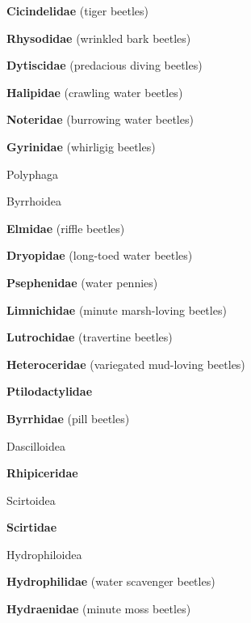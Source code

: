 \documentclass[letterpaper,10pt]{article}
\begin{document}
{\makebox[0.6cm]{}  \textbf{Cicindelidae} (tiger beetles) \par
\makebox[0.6cm]{}  \textbf{Rhysodidae} (wrinkled bark beetles) \par
\makebox[0.6cm]{}  \textbf{Dytiscidae} (predacious diving beetles) \par
\makebox[0.6cm]{}  \textbf{Halipidae} (crawling water beetles) \par
\makebox[0.6cm]{}  \textbf{Noteridae} (burrowing water beetles) \par
\makebox[0.6cm]{}  \textbf{Gyrinidae} (whirligig beetles) \par
\makebox[0.20cm]{}  Polyphaga \par
\makebox[0.40cm]{}  Byrrhoidea \par
\makebox[0.6cm]{}  \textbf{Elmidae} (riffle beetles) \par
\makebox[0.6cm]{}  \textbf{Dryopidae} (long-toed water beetles) \par
\makebox[0.6cm]{}  \textbf{Psephenidae} (water pennies) \par
\makebox[0.6cm]{}  \textbf{Limnichidae} (minute marsh-loving beetles) \par
\makebox[0.6cm]{}  \textbf{Lutrochidae} (travertine beetles) \par
\makebox[0.6cm]{}  \textbf{Heteroceridae} (variegated mud-loving beetles) \par
\makebox[0.6cm]{}  \textbf{Ptilodactylidae} \par
\makebox[0.6cm]{}  \textbf{Byrrhidae} (pill beetles) \par
\makebox[0.40cm]{}  Dascilloidea \par
\makebox[0.6cm]{}  \textbf{Rhipiceridae} \par
\makebox[0.40cm]{}  Scirtoidea \par
\makebox[0.6cm]{}  \textbf{Scirtidae} \par
\makebox[0.40cm]{}  Hydrophiloidea \par
\makebox[0.6cm]{}  \textbf{Hydrophilidae} (water scavenger beetles) \par
\makebox[0.6cm]{}  \textbf{Hydraenidae} (minute moss beetles) \par
}
\end{document}

